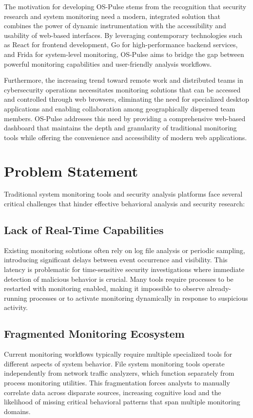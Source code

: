 The motivation for developing OS-Pulse stems from the recognition that security research and system monitoring need a modern, integrated solution that combines the power of dynamic instrumentation with the accessibility and usability of web-based interfaces. By leveraging contemporary technologies such as React for frontend development, Go for high-performance backend services, and Frida for system-level monitoring, OS-Pulse aims to bridge the gap between powerful monitoring capabilities and user-friendly analysis workflows.

Furthermore, the increasing trend toward remote work and distributed teams in cybersecurity operations necessitates monitoring solutions that can be accessed and controlled through web browsers, eliminating the need for specialized desktop applications and enabling collaboration among geographically dispersed team members. OS-Pulse addresses this need by providing a comprehensive web-based dashboard that maintains the depth and granularity of traditional monitoring tools while offering the convenience and accessibility of modern web applications.

\section{Problem Statement}

Traditional system monitoring tools and security analysis platforms face several critical challenges that hinder effective behavioral analysis and security research:

\subsection*{Lack of Real-Time Capabilities}
Existing monitoring solutions often rely on log file analysis or periodic sampling, introducing significant delays between event occurrence and visibility. This latency is problematic for time-sensitive security investigations where immediate detection of malicious behavior is crucial. Many tools require processes to be restarted with monitoring enabled, making it impossible to observe already-running processes or to activate monitoring dynamically in response to suspicious activity.

\subsection*{Fragmented Monitoring Ecosystem}
Current monitoring workflows typically require multiple specialized tools for different aspects of system behavior. File system monitoring tools operate independently from network traffic analyzers, which function separately from process monitoring utilities. This fragmentation forces analysts to manually correlate data across disparate sources, increasing cognitive load and the likelihood of missing critical behavioral patterns that span multiple monitoring domains.

